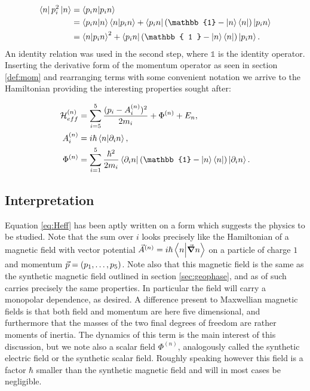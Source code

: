 \documentclass[a4paper]{article}
\begin{document}
\begin{align*}
        \bra{n} p_i^2\ket{n} &= \bra{p_i n} \ket{p_i n}\\
                                                 &=
                                                 \bra{p_i
                                                 n}\ket{n}\bra{n}\ket{p_i n}
                                                 + \bra{p_i n} (\mathbb{1} - \ket{n}
                                                 \bra{n}) \ket{p_i n}\\
                                                 &= \bra{n}\ket{p_i n}^2 +
                                                         \bra{p_i n} (\mathbb{ 1 } -
                                                         \ket{n}\bra{n})\ket{p_i
                                                         n}
.\end{align*}
An identity relation was used in the second step, where \(\mathbb{1}\) is the identity
operator.
Inserting the derivative form of the momentum operator as seen in section \ref{def:mom}
and rearranging terms with some convenient notation we arrive to the Hamiltonian providing the interesting properties
sought after:

\begin{align}\label{eq:Heff}
        \mathbb{\cal H}^{(n)}_{eff} &= \sum_{i=5}^{5} \frac{(p_i - A^{(n)}_i)^2}{2m_i} + \Phi^{(n)} + E_n,\\
        A^{(n)}_i &= i\hbar{}\bra{n}\ket{\partial_i n},\\
        \Phi^{(n)} &= \sum_{i=1}^{5} \frac{\hbar{}^{2}}{2m_i}\bra{\partial_i n}(\mathbb{1} - \ket{n}
    \bra{n})\ket{\partial_i n}
.\end{align}
\subsection{Interpretation}\label{sec:BOinterp}
Equation \ref{eq:Heff} has been aptly written on a form which suggests the physics to be
studied. Note that the sum over \(i\) looks precisely like the Hamiltonian of a magnetic field
with vector potential \(\vec{A}^{(n)} = i\hbar{}\bra{n}\ket{\grad n}\) on a particle of charge
\(1\) and momentum \(\vec{p} = (p_1, \ldots,p_5)\). Note also that this magnetic field is
the same as the synthetic magnetic field outlined in section \ref{sec:geophase}, and as of
such carries precisely the same properties. In particular the field will carry a monopolar
dependence, as desired. A difference present to Maxwellian magnetic fields is that both field and momentum are here five dimensional, and
furthermore that the masses of the two final degrees of freedom are rather moments of
inertia. The dynamics of this term is the
main interest of this discussion, but we note also a scalar field \(\Phi^{(n)}\), analogously called the
synthetic electric field or the synthetic scalar field. Roughly speaking however this
field is a factor \(\hbar{}\) smaller than the synthetic magnetic field and will in most
cases be negligible. 
\end{document}
